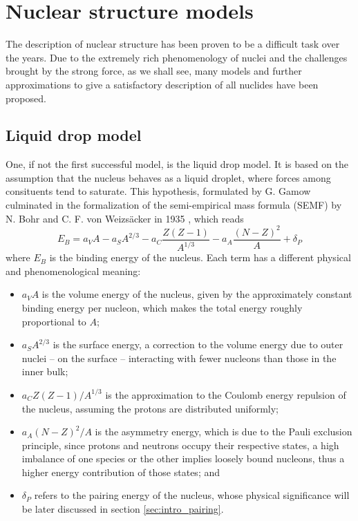 \section{Nuclear structure models}
The description of nuclear structure has been proven to be a difficult task over the years. Due to the extremely rich phenomenology of nuclei and the challenges brought by the strong force, as we shall see, many models and further approximations to give a satisfactory description of all nuclides have been proposed.
\subsection{Liquid drop model}
One, if not the first successful model, is the liquid drop model. It is based on the assumption that the nucleus behaves as a liquid droplet, where forces among consituents tend to saturate. This hypothesis, formulated by G. Gamow culminated in the formalization of the semi-empirical mass formula (SEMF) by N. Bohr and C. F. von Weizsäcker in 1935 \cite{Weizsacker1935}, which reads
\begin{equation}
    \label{eq:semf}
    E_B=a_V A - a_S A^{2/3} - a_C \frac{Z(Z-1)}{A^{1/3}} - a_A \frac{(N-Z)^2}{A} + \delta_P
\end{equation}
where $E_B$ is the binding energy of the nucleus. Each term has a different physical and phenomenological meaning:
\begin{itemize}
    \item $a_V A$ is the volume energy of the nucleus, given by the approximately constant binding energy per nucleon, which makes the total energy roughly proportional to $A$;
    \item $a_S A^{2/3}$ is the surface energy, a correction to the volume energy due to outer nuclei -- on the surface -- interacting with fewer nucleons than those in the inner bulk;
    \item $a_C Z(Z-1)/A^{1/3}$ is the approximation to the Coulomb energy repulsion of the nucleus, assuming the protons are distributed uniformly;
    \item $a_A (N-Z)^2/A$ is the asymmetry energy, which is due to the Pauli exclusion principle, since protons and neutrons occupy their respective states, a high imbalance of one species or the other implies loosely bound nucleons, thus a higher energy contribution of those states; and
    \item $\delta_P$ refers to the pairing energy of the nucleus, whose physical significance will be later discussed in section \ref{sec:intro_pairing}.
\end{itemize}
